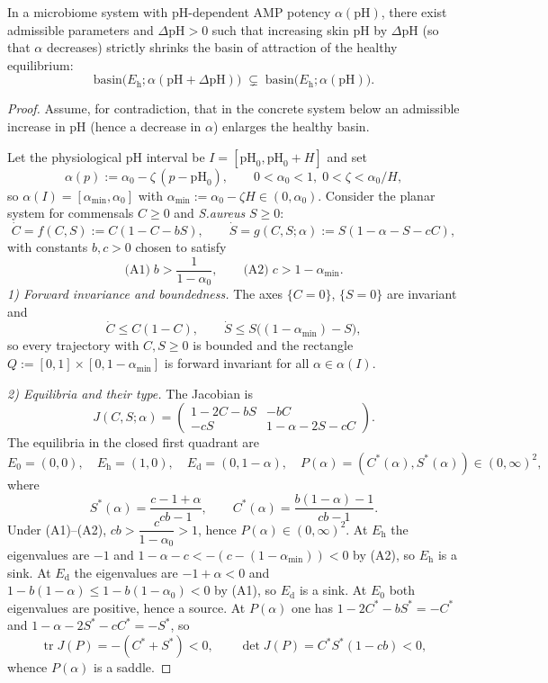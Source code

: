 ﻿\begin{theorem}\label{thm:ph-basin-shrink}
In a microbiome system with pH-dependent AMP potency \(\alpha(\mathrm{pH})\), there exist admissible parameters and \(\Delta\mathrm{pH}>0\) such that increasing skin pH by \(\Delta\mathrm{pH}\) (so that \(\alpha\) decreases) strictly shrinks the basin of attraction of the healthy equilibrium:
\[
\mathrm{basin}\big(E_{\mathrm{h}};\alpha(\mathrm{pH}{+}\Delta\mathrm{pH})\big)\;\subsetneq\;\mathrm{basin}\big(E_{\mathrm{h}};\alpha(\mathrm{pH})\big).
\]
\end{theorem}
\begin{proof}
Assume, for contradiction, that in the concrete system below an admissible increase in pH (hence a decrease in \(\alpha\)) enlarges the healthy basin.

Let the physiological pH interval be \(I=[\mathrm{pH}_0,\mathrm{pH}_0+H]\) and set
\[
\alpha(p):=\alpha_0-\zeta\,(p-\mathrm{pH}_0),\qquad 0<\alpha_0<1,\;0<\zeta<\alpha_0/H,
\]
so \(\alpha(I)=[\alpha_{\min},\alpha_0]\) with \(\alpha_{\min}:=\alpha_0-\zeta H\in(0,\alpha_0)\). Consider the planar system for commensals \(C\ge 0\) and \emph{S.\!aureus} \(S\ge 0\):
\[
\dot C=f(C,S):=C(1-C-bS),\qquad \dot S=g(C,S;\alpha):=S(1-\alpha-S-cC),
\]
with constants \(b,c>0\) chosen to satisfy
\[
\text{(A1)}\; b>\frac{1}{1-\alpha_0},\qquad \text{(A2)}\; c>1-\alpha_{\min}.
\]
\emph{1) Forward invariance and boundedness.} The axes \(\{C=0\}\), \(\{S=0\}\) are invariant and
\[
\dot C\le C(1-C),\qquad \dot S\le S\big((1-\alpha_{\min})-S\big),
\]
so every trajectory with \(C,S\ge 0\) is bounded and the rectangle \(Q:=[0,1]\times[0,1-\alpha_{\min}]\) is forward invariant for all \(\alpha\in\alpha(I)\).

\emph{2) Equilibria and their type.} The Jacobian is
\[
J(C,S;\alpha)=\begin{pmatrix}1-2C-bS & -bC\\ -cS & 1-\alpha-2S-cC\end{pmatrix}.
\]
The equilibria in the closed first quadrant are
\[
E_0=(0,0),\quad E_{\mathrm{h}}=(1,0),\quad E_{\mathrm{d}}=(0,1-\alpha),\quad P(\alpha)=(C^*(\alpha),S^*(\alpha))\in(0,\infty)^2,
\]
where
\[
S^*(\alpha)=\frac{c-1+\alpha}{cb-1},\qquad C^*(\alpha)=\frac{b(1-\alpha)-1}{cb-1}.
\]
Under (A1)--(A2), \(cb>\dfrac{c}{1-\alpha_0}>1\), hence \(P(\alpha)\in(0,\infty)^2\). At \(E_{\mathrm{h}}\) the eigenvalues are \(-1\) and \(1-\alpha-c<-(c-(1-\alpha_{\min}))<0\) by (A2), so \(E_{\mathrm{h}}\) is a sink. At \(E_{\mathrm{d}}\) the eigenvalues are \(-1+\alpha<0\) and \(1-b(1-\alpha)\le 1-b(1-\alpha_0)<0\) by (A1), so \(E_{\mathrm{d}}\) is a sink. At \(E_0\) both eigenvalues are positive, hence a source. At \(P(\alpha)\) one has \(1-2C^*-bS^*=-C^*\) and \(1-\alpha-2S^*-cC^*=-S^*\), so
\[
\operatorname{tr}J(P)=-(C^*+S^*)<0,\qquad \det J(P)=C^*S^*(1-cb)<0,
\]
whence \(P(\alpha)\) is a saddle.


\end{proof}
